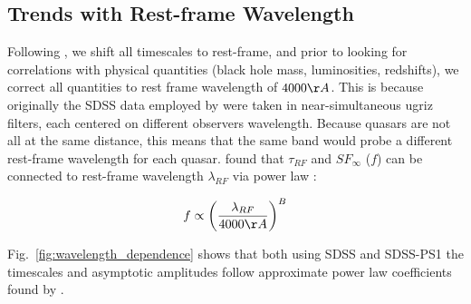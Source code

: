 \documentclass[twocolumn]{aastex62}
\begin{document}

\begin{figure*}
\caption{Comparing the rest-frame timescales $\tau$, and asymptotic variability amplitudes $SF_{\infty}$, for \citet{macleod2011} SDSS r-band,  and combined SDSS and PS1 data.  }
\label{fig:tauRF_SFinf}
\end{figure*} 

\subsection{Trends with Rest-frame Wavelength}

Following  \citet{macleod2011} , we shift all timescales to rest-frame, and prior to looking for correlations with physical quantities (black hole mass, luminosities, redshifts), we correct all quantities to rest frame wavelength of $4000 \AA $. This is because originally the SDSS data employed by  \citet{macleod2011}  were taken in near-simultaneous ugriz filters, each centered on different observers wavelength. Because quasars are not all at the same distance, this means that the same band would probe a different rest-frame wavelength for each quasar.   \citet{macleod2011}  found that $\tau_{RF}$ and $SF_{\infty}$  ($f$) can be connected to rest-frame wavelength $\lambda_{RF}$ via power law  :  

\begin{equation}
f \propto \left( \frac{\lambda_{RF}}{4000 \AA} \right)^{B}
\end{equation}

Fig.~\ref{fig:wavelength_dependence}  shows that both using SDSS and SDSS-PS1 the timescales and asymptotic amplitudes follow approximate power law coefficients found by \citet{macleod2011}. 




\begin{figure*}
\caption{Rest-frame timescale $\tau$ (top panel), and long-term structure function $SF_{\infty}$ (bottom panel), as a function of rest-frame wavelength $\lambda_{RF}$. The background contours show \citet{macleod2011} SDSS ugriz data, and the foreground contours  denote the SDSS (red) and SDSS-PS1 (orange) new results with Celerite. In all datasets the quasars were selected according to criteria of \citet{macleod2011}. The red line indicates the best-fit power law to \citet{macleod2011} data, with $B=0.17$ an $-0.479$ for $\tau_{RF}$, and $SF_{\infty}$, respectively.}
\label{fig:wavelength_dependence}
\end{figure*} 
\end{document}
